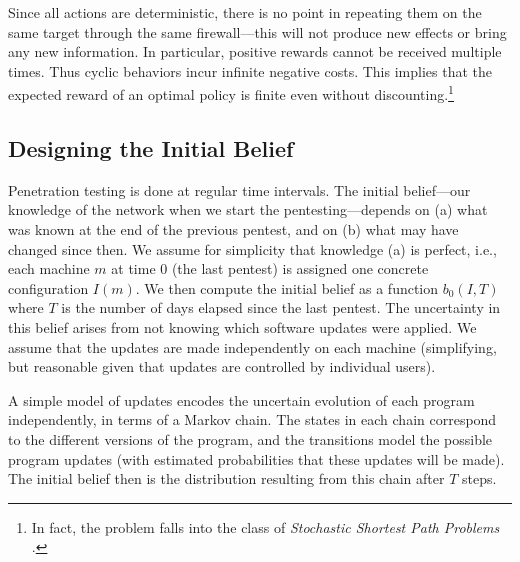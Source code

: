 Since all actions are deterministic, there is no point in repeating
them on the same target through the same firewall---this will not
produce new effects or bring any new information. In particular,
positive rewards cannot be received multiple times. Thus cyclic
behaviors incur infinite negative costs. This implies that the
expected reward of an optimal policy is finite even without
discounting.\footnote{In fact, the problem falls into the class of
  \emph{Stochastic Shortest Path Problems} \cite{BerTsi96}.}




\subsection{Designing the Initial Belief}
\label{POMDP-model:initial-belief}


Penetration testing is done at regular time intervals. The initial
belief---our knowledge of the network when we start the
pentesting---depends on (a) what was known at the end of the previous
pentest, and on (b) what may have changed since then. We assume for
simplicity that knowledge (a) is perfect, i.e., each machine $m$ at
time $0$ (the last pentest) is assigned one concrete configuration
$I(m)$. We then compute the initial belief as a function $b_0(I,T)$
where $T$ is the number of days elapsed since the last pentest. The
uncertainty in this belief arises from not knowing which software
updates were applied. We assume that the updates are made
independently on each machine (simplifying, but reasonable given that
updates are controlled by individual users).

A simple model of updates \cite{SarBufHof11} encodes the uncertain
evolution of each program independently, in terms of a Markov
chain. The states in each chain correspond to the different versions
of the program, and the transitions model the possible program updates
(with estimated probabilities that these updates will be made). The
initial belief then is the distribution resulting from this chain
after $T$ steps.

